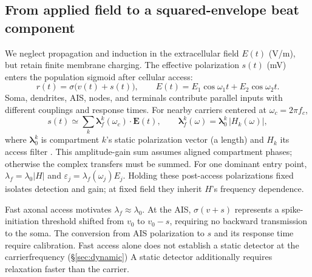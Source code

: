 \documentclass[11pt,a4paper]{article}
\newcommand{\Sig}{\sigma}
\providecommand{\DIFaddtex}[1]{{\protect\color{blue} \sf #1}} %
\providecommand{\DIFdeltex}[1]{{\protect\color{red} \scriptsize #1}} %
\providecommand{\DIFaddbegin}{} %
\providecommand{\DIFaddend}{} %
\providecommand{\DIFdelbegin}{} %
\providecommand{\DIFdelend}{} %
\providecommand{\DIFadd}[1]{\texorpdfstring{\DIFaddtex{#1}}{#1}} %
\providecommand{\DIFdel}[1]{\texorpdfstring{\DIFdeltex{#1}}{}} %
\begin{document}
\subsection{From applied field to a squared-envelope beat component}\label{sec:coupling}
We neglect propagation and induction in the extracellular field $E(t)$ (V/m),
but retain finite membrane charging. The effective polarization $s(t)$ (mV)
enters the population sigmoid after cellular access:
\begin{equation}
r(t)=\Sig\!\big(v(t)+s(t)\big),\qquad
E(t)=E_1\cos\omega_1 t+E_2\cos\omega_2 t .
\label{eq:coupling}
\end{equation}
Soma, dendrites, AIS, nodes, and terminals contribute parallel inputs with
different couplings and response times. For nearby carriers centered at
$\omega_c=2\pi f_c$,
\begin{equation}
s(t)\simeq\sum_k \boldsymbol\lambda^k_f(\omega_c)\!\cdot\!\mathbf E(t),\qquad
\boldsymbol\lambda^k_f(\omega)=\boldsymbol\lambda^k_0\,\lvert H_k(\omega)\rvert,
\label{eq:doors}
\end{equation}
where $\boldsymbol\lambda^k_0$ is compartment $k$'s static polarization vector
(a length) and $H_k$ its access filter \cite{ruffini2025rosetta,galangadea2023}.
This amplitude-gain sum assumes aligned compartment phases; otherwise the
complex transfers must be summed. For one dominant entry point,
$\lambda_f=\lambda_0|H|$ and $\varepsilon_j=\lambda_f(\omega_j)E_j$.
Holding these post-access polarizations fixed isolates detection and gain;
at fixed field they inherit $H$'s frequency dependence.

Fast axonal access motivates $\lambda_f\approx\lambda_0$. At the AIS,
$\Sig(v+s)$ represents a spike-initiation threshold shifted from $v_0$ to
$v_0-s$, requiring no backward transmission to the soma. The conversion from
AIS polarization to $s$ and its response time require calibration. \DIFdelbegin \DIFdel{Fast
access alone does not establish a static
detector at the carrierfrequency
(\S\ref{sec:dynamic})}\DIFdelend \DIFaddbegin \DIFadd{A static
detector additionally requires relaxation faster than the carrier}\DIFaddend .
\end{document}
